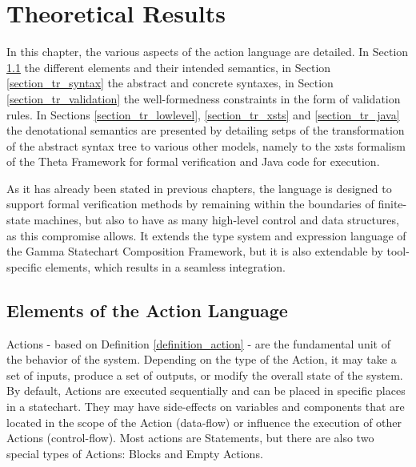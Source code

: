 \chapter{Theoretical Results} \label{chapter_theoreticalResults}
In this chapter, the various aspects of the action language are detailed. In Section \ref{section_tr_elements} the different elements and their intended semantics, in Section \ref{section_tr_syntax} the abstract and concrete syntaxes, in Section \ref{section_tr_validation} the well-formedness constraints in the form of validation rules. In Sections \ref{section_tr_lowlevel}, \ref{section_tr_xsts} and \ref{section_tr_java} the denotational semantics are presented by detailing setps of the transformation of the abstract syntax tree to various other models, namely to the xsts formalism of the Theta Framework for formal verification and Java code for execution.

As it has already been stated in previous chapters, the language is designed to support formal verification methods by remaining within the boundaries of finite-state machines, but also to have as many high-level control and data structures, as this compromise allows. It extends the type system and expression language of the Gamma Statechart Composition Framework, but it is also extendable by tool-specific elements, which results in a seamless integration.

\section{Elements of the Action Language} \label{section_tr_elements}
Actions - based on Definition \ref{definition_action} - are the fundamental unit of the behavior of the system. Depending on the type of the Action, it may take a set of inputs, produce a set of outputs, or modify the overall state of the system. By default, Actions are executed sequentially and can be placed in specific places in a statechart. They may have side-effects on variables and components that are located in the scope of the Action (data-flow) or influence the execution of other Actions (control-flow). Most actions are Statements, but there are also two special types of Actions: Blocks and Empty Actions.

